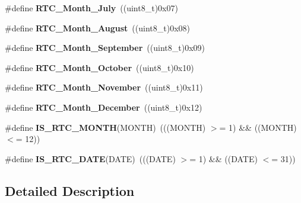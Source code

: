 \begin{DoxyCompactItemize}
\item 
\hypertarget{group___r_t_c___month___date___definitions_gac1a6c0474aeb703c29bb0f1c22011b01}{\#define {\bfseries R\-T\-C\-\_\-\-Month\-\_\-\-July}~((uint8\-\_\-t)0x07)}\label{group___r_t_c___month___date___definitions_gac1a6c0474aeb703c29bb0f1c22011b01}

\item 
\hypertarget{group___r_t_c___month___date___definitions_ga03e76764a3d7b01ef13c6cdabb6e05c8}{\#define {\bfseries R\-T\-C\-\_\-\-Month\-\_\-\-August}~((uint8\-\_\-t)0x08)}\label{group___r_t_c___month___date___definitions_ga03e76764a3d7b01ef13c6cdabb6e05c8}

\item 
\hypertarget{group___r_t_c___month___date___definitions_ga49e0cdf9d6f449872944ee63acab3dd0}{\#define {\bfseries R\-T\-C\-\_\-\-Month\-\_\-\-September}~((uint8\-\_\-t)0x09)}\label{group___r_t_c___month___date___definitions_ga49e0cdf9d6f449872944ee63acab3dd0}

\item 
\hypertarget{group___r_t_c___month___date___definitions_ga862ea2da95dd5a040ee5e6da1079ccc9}{\#define {\bfseries R\-T\-C\-\_\-\-Month\-\_\-\-October}~((uint8\-\_\-t)0x10)}\label{group___r_t_c___month___date___definitions_ga862ea2da95dd5a040ee5e6da1079ccc9}

\item 
\hypertarget{group___r_t_c___month___date___definitions_ga0d944af7d193e8bc1bbdfc8764be49cb}{\#define {\bfseries R\-T\-C\-\_\-\-Month\-\_\-\-November}~((uint8\-\_\-t)0x11)}\label{group___r_t_c___month___date___definitions_ga0d944af7d193e8bc1bbdfc8764be49cb}

\item 
\hypertarget{group___r_t_c___month___date___definitions_ga5bda2ebb05c99e18e819c8582592ac00}{\#define {\bfseries R\-T\-C\-\_\-\-Month\-\_\-\-December}~((uint8\-\_\-t)0x12)}\label{group___r_t_c___month___date___definitions_ga5bda2ebb05c99e18e819c8582592ac00}

\item 
\hypertarget{group___r_t_c___month___date___definitions_ga7fa60f17b2ae529c35b1fa3dd4d6853f}{\#define {\bfseries I\-S\-\_\-\-R\-T\-C\-\_\-\-M\-O\-N\-T\-H}(M\-O\-N\-T\-H)~(((M\-O\-N\-T\-H) $>$= 1) \&\& ((M\-O\-N\-T\-H) $<$= 12))}\label{group___r_t_c___month___date___definitions_ga7fa60f17b2ae529c35b1fa3dd4d6853f}

\item 
\hypertarget{group___r_t_c___month___date___definitions_ga3b6e966e144cb0495563ef0283d16510}{\#define {\bfseries I\-S\-\_\-\-R\-T\-C\-\_\-\-D\-A\-T\-E}(D\-A\-T\-E)~(((D\-A\-T\-E) $>$= 1) \&\& ((D\-A\-T\-E) $<$= 31))}\label{group___r_t_c___month___date___definitions_ga3b6e966e144cb0495563ef0283d16510}

\end{DoxyCompactItemize}


\subsection{Detailed Description}
